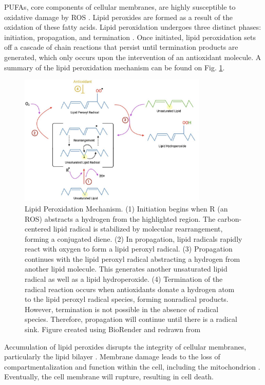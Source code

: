 \Acp{PUFA}, core components of cellular membranes, are highly susceptible to oxidative damage by \ac{ROS} \citep{lpperox}. Lipid peroxides are formed as a result of the oxidation of these fatty acids. Lipid peroxidation undergoes three distinct phases: initiation, propagation, and termination \citep{lpperox2}. Once initiated, lipid peroxidation sets off a cascade of chain reactions that persist until termination products are generated, which only occurs upon the intervention of an antioxidant molecule. A summary of the lipid peroxidation mechanism can be found on Fig. \ref{fig:lpperox}.

\begin{figure}[ht]
	\begin{center}
		\includegraphics[width = 0.8\textwidth]{Fig/lpperox.jpg}
	\end{center}
	\caption{Lipid Peroxidation Mechanism. (1) Initiation begins when R (an \ac{ROS}) abstracts a hydrogen from the highlighted region. The carbon-centered lipid radical is stabilized by molecular rearrangement, forming a conjugated diene. (2) In propagation, lipid radicals rapidly react with oxygen to form a lipid peroxyl radical. (3) Propagation continues with the lipid peroxyl radical abstracting a hydrogen from another lipid molecule. This generates another unsaturated lipid radical as well as a lipid hydroperoxide. (4) Termination of the radical reaction occurs when antioxidants donate a hydrogen atom to the lipid peroxyl radical species, forming nonradical products.  However, termination is not possible in the absence of radical species. Therefore, propagation will continue until there is a radical sink. Figure created using BioRender and redrawn from \cite{lpperox}}\label{fig:lpperox}
\end{figure}

Accumulation of lipid peroxides disrupts the integrity of cellular membranes, particularly the lipid bilayer \citep{lppmembrane}. Membrane damage leads to the loss of compartmentalization and function within the cell, including the mitochondrion \citep{lppmito}. Eventually, the cell membrane will rupture, resulting in cell death.

